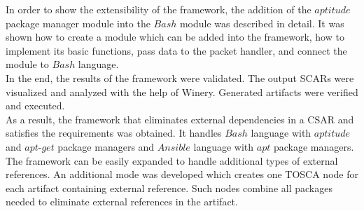 In order to show the extensibility of the framework, the addition of the $aptitude$ package manager module into the $Bash$ module was described in detail.
It  was shown how to create a module which can be added into the framework, how to implement its basic functions, pass data to the packet handler, and connect the module to $Bash$ language. \\
In the end, the results of the framework were validated.
The output SCARs were visualized and analyzed with the help of Winery.
Generated artifacts were verified and executed.\\
As a result, the framework that eliminates external dependencies in a CSAR and satisfies the requirements was obtained.
It handles $Bash$ language with $aptitude$ and $apt$-$get$ package managers and $Ansible$ language with $apt$ package managers.
The framework can be easily expanded to handle additional types of external references. 
An additional mode was developed which creates one TOSCA node for each artifact containing external reference.
Such nodes combine all packages needed to eliminate external references in the artifact.
